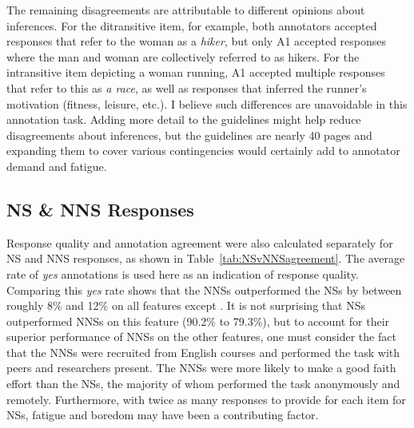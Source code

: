 The remaining disagreements are attributable to different opinions about inferences.  For the ditransitive item, for example, both annotators accepted responses that refer to the woman as a \textit{hiker}, but only A1 accepted responses where the man and woman are collectively referred to as hikers. For the intransitive item depicting a woman running, A1 accepted multiple responses that refer to this as \textit{a race}, as well as responses that inferred the runner's motivation (fitness, leisure, etc.). I believe such differences are unavoidable in this annotation task. Adding more detail to the guidelines might help reduce disagreements about inferences, but the guidelines are nearly 40 pages and expanding them to cover various contingencies would certainly add to annotator demand and fatigue.

\subsection{NS \& NNS Responses}
\label{NSandNNSagreement}
Response quality and annotation agreement were also calculated separately for NS and NNS responses, as shown in Table~\ref{tab:NSvNNSagreement}. The average rate of \textit{yes} annotations is used here as an indication of response quality. Comparing this \textit{yes} rate shows that the NNSs outperformed the NSs by between roughly 8\% and 12\% on all features except . It is not surprising that NSs outperformed NNSs on this feature (90.2\% to 79.3\%), but to account for their superior performance of NNSs on the other features, one must consider the fact that the NNSs were recruited from English courses and performed the task with peers and researchers present. The NNSs were more likely to make a good faith effort than the NSs, the majority of whom performed the task anonymously and remotely. Furthermore, 
with twice as many responses to provide for each item for NSs, fatigue and boredom may have been a contributing factor.



